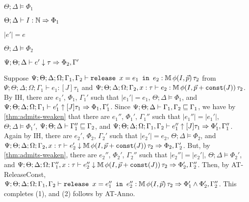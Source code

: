 {{  

   $\Theta ; \Delta \vDash \Phi_1$
  
   $\Theta ; \Delta \vdash I : \mathbb{N} \Rightarrow \Phi_1$


   $|e'| = e$

   $\Theta ; \Delta \vDash \Phi_2$

   $\Psi ; \Theta ; \Delta \vdash e' \downarrow \tau \Rightarrow \Phi_2,\Gamma'$


 }


}

\iffalse
  \item[(T-ReleaseConst)] Suppose
  $\Psi ; \Theta ; \Delta ; \Omega ; \Gamma_1,\Gamma_2 \vdash \texttt{release } x = e_1 \texttt{ in }e_2 : \mathbb{M} \, \phi(I,\vec{p}) \, \tau_2$ from
  $\Psi ; \Theta ; \Delta ; \Omega ; \Gamma_1 \vdash e_1 : [J] \tau_1$ and
  $\Psi ; \Theta ; \Delta ; \Omega ; \Gamma_2, x : \tau \vdash e_2 : \mathbb{M} \, \phi(I,\vec{p} + \texttt{const}(J)) \, \tau_2$.
  By IH, there are $e_1'$, $\Phi_1$, $\Gamma_1'$ such that
  $|e_1'| = e_1$,
  $\Theta ; \Delta \vDash \Phi_1$, and
  $\Psi ; \Theta ; \Delta ; \Omega ; \Gamma_1 \vdash e_1' \uparrow [J] \tau_1 \Rightarrow \Phi_1,\Gamma_1'$.
  Since $\Psi ; \Theta ; \Delta \vdash \Gamma_1,\Gamma_2 \sqsubseteq \Gamma_1$, we have by \autoref{thm:admits-weaken}
  that there are $e_1''$, $\Phi_1'$, $\Gamma_1''$ such that
  $|e_1''| = |e_1'|$,
  $\Theta ; \Delta \vDash \Phi_1'$,
  $\Psi ; \Theta ; \Delta \vdash \Gamma_1'' \sqsubseteq \Gamma_2$, and
  $\Psi ; \Theta ; \Delta ; \Omega; \Gamma_1,\Gamma_2 \vdash e_1'' \uparrow [J] \tau_1 \Rightarrow \Phi_1',\Gamma_1''$.
  Again by IH, there are $e_2'$, $\Phi_2$, $\Gamma_2'$ such that
  $|e_2'| = e_2$,
  $\Theta ; \Delta \vDash \Phi_2$, and
  $\Psi ; \Theta ; \Delta ; \Omega ; \Gamma_2, x : \tau \vdash e_2' \downarrow \mathbb{M} \, \phi(I,\vec{p} + \texttt{const}(J)) \, \tau_2 \Rightarrow \Phi_2,\Gamma_2'$.
  But, by \autoref{thm:admits-weaken}, there are $e_2''$, $\Phi_2'$, $\Gamma_2''$ such that
  $|e_2''| = |e_2'|$,
  $\Theta ; \Delta \vDash \Phi_2'$, and
  $\Psi ; \Theta ; \Delta ; \Omega ; \Gamma_1'', x: \tau \vdash e_2'' \downarrow  \mathbb{M} \, \phi(I,\vec{p} + \texttt{const}(J)) \, \tau_2 \Rightarrow \Phi_2',\Gamma_2''$.
  Then, by AT-ReleaseConst, 
  $\Psi ; \Theta ; \Delta ; \Omega ; \Gamma_1,\Gamma_2 \vdash \texttt{release } x = e_1'' \texttt{ in }e_2'' : \mathbb{M} \, \phi(I,\vec{p}) \, \tau_2 \Rightarrow \Phi_1' \wedge \Phi_2',\Gamma_2''$.
  This completes (1), and (2) follows by AT-Anno.
  

